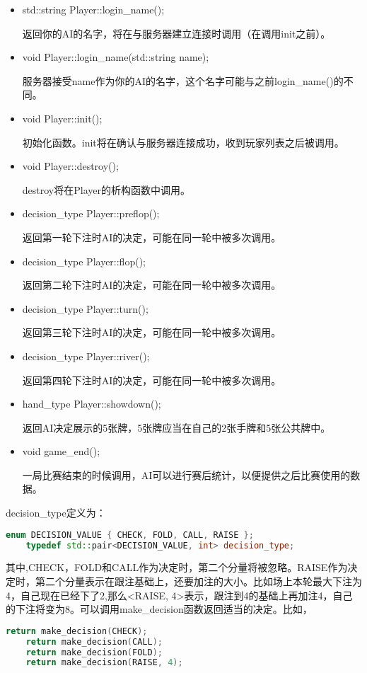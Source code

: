 \documentclass[11pt, fleqn, a4paper]{article}
\begin{document}
\begin{itemize}
	\item std::string Player::login\_name();
	
		返回你的AI的名字，将在与服务器建立连接时调用（在调用init之前）。
		
	\item void Player::login\_name(std::string name);
	
		服务器接受name作为你的AI的名字，这个名字可能与之前login\_name()的不同。
	\item void Player::init();
		
		初始化函数。init将在确认与服务器连接成功，收到玩家列表之后被调用。
	
	\item void Player::destroy();
		
		destroy将在Player的析构函数中调用。	
		
	\item decision\_type Player::preflop();
		
		返回第一轮下注时AI的决定，可能在同一轮中被多次调用。
		
	\item decision\_type Player::flop();
	
		返回第二轮下注时AI的决定，可能在同一轮中被多次调用。
		
	\item decision\_type Player::turn();
	
		返回第三轮下注时AI的决定，可能在同一轮中被多次调用。
		
	\item decision\_type Player::river();
	
		返回第四轮下注时AI的决定，可能在同一轮中被多次调用。		
		
	\item hand\_type Player::showdown();
			
		返回AI决定展示的5张牌，5张牌应当在自己的2张手牌和5张公共牌中。
		
	\item void game\_end();
	
		一局比赛结束的时候调用，AI可以进行赛后统计，以便提供之后比赛使用的数据。
		
\end{itemize}

decision\_type定义为：
\begin{lstlisting}[language=C++]
	enum DECISION_VALUE { CHECK, FOLD, CALL, RAISE };
	typedef std::pair<DECISION_VALUE, int> decision_type;
\end{lstlisting}
其中,CHECK，FOLD和CALL作为决定时，第二个分量将被忽略。RAISE作为决定时，第二个分量表示在跟注基础上，还要加注的大小。比如场上本轮最大下注为4，自己现在已经下了2,那么<RAISE, 4>表示，跟注到4的基础上再加注4，自己的下注将变为8。可以调用make\_decision函数返回适当的决定。比如，
\begin{lstlisting}[language=C++]
	return make_decision(CHECK);
	return make_decision(CALL);
	return make_decision(FOLD);
	return make_decision(RAISE, 4);
\end{lstlisting}
\end{document}
